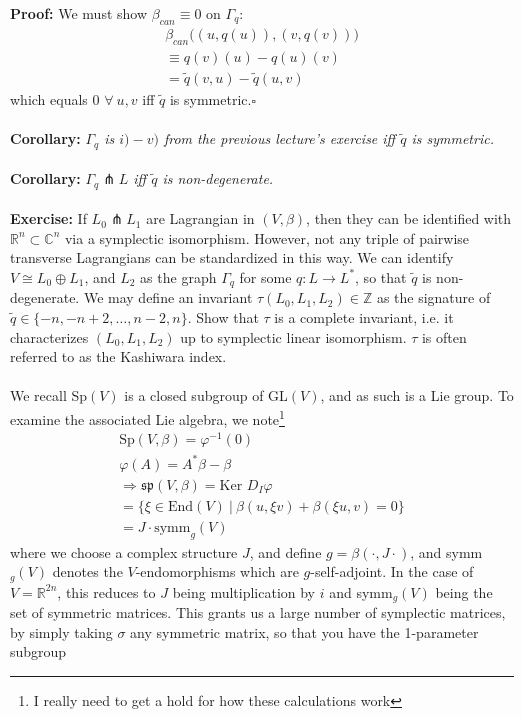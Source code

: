 \documentclass[12pt]{report}
\theoremstyle{definition}
\theoremstyle{remark}
\numberwithin{equation}{section}
\theoremstyle{definition}
\newcommand{\inv}[1]{#1^{-1}}
\newcommand{\bb}[1]{\mathbb{#1}}
\newcommand{\mqed}{\hfill\newline\null \hfill$\square$\\ }
\renewcommand{\tilde}{\widetilde}
\begin{document}
\textbf{Proof: }We must show $\beta_{can} \equiv 0$ on $\Gamma_q$:
\begin{gather*}
	\beta_{can}\Big((u,q(u)),(v,q(v))	\Big)\\
	\equiv q(v)(u)-q(u)(v)\\
	= \tilde q(v,u) - \tilde q(u,v)
\end{gather*} 
which equals 0 $\forall\ u,v$ iff $\tilde q$ is symmetric.\mqed\\
\textbf{Corollary: }\textit{$\Gamma_q$ is $i)-v)$ from the previous lecture's exercise iff $\tilde q$ is symmetric. }\\\\
\textbf{Corollary: }\textit{$\Gamma_q \pitchfork L$ iff $\tilde q$ is non-degenerate.}\\\\
\textbf{Exercise: }If $L_0 \pitchfork L_1$ are Lagrangian in $(V,\beta)$, then they can be identified with $\bb R^n \subset \bb C^n$ via a symplectic isomorphism. However, not any triple of pairwise transverse Lagrangians can be standardized in this way. We can identify $V \cong L_0 \oplus L_1$, and $L_2$ as the graph $\Gamma_q$ for some $q: L \to L^*$, so that $\tilde q$ is non-degenerate. We may define an invariant $\tau(L_0,L_1,L_2) \in \bb Z$ as the signature of $\tilde q \in \{-n, -n+2, \dots, n-2, n\}$. Show that $\tau$ is a complete invariant, i.e. it characterizes $(L_0, L_1, L_2)$ up to symplectic linear isomorphism. $\tau$ is often referred to as the Kashiwara index. \\\\
We recall Sp$(V)$ is a closed subgroup of GL$(V)$, and as such is a Lie group. To examine the associated Lie algebra, we note\footnote{I really need to get a hold for how these calculations work} 
\begin{gather*}
	\text{Sp}(V,\beta) = \inv \varphi(0)\\
	\varphi(A) = A^* \beta - \beta\\
	\Rightarrow \mathfrak{sp}(V,\beta) = \text{Ker } D_I \varphi \\
	= \{\xi \in \text{End}(V)\ |\ \beta(u,\xi v) + \beta(\xi u,v) = 0\}	\\
	= J \cdot \text{symm}_g(V)
\end{gather*}
where we choose a complex structure $J$, and define $g = \beta(\cdot, J\cdot)$, and symm$_g(V)$ denotes the $V$-endomorphisms which are $g$-self-adjoint. In the case of $V = \bb R^{2n}$, this reduces to $J$ being multiplication by $i$ and symm$_g(V)$ being the set of symmetric matrices. This grants us a large number of symplectic matrices, by simply taking $\sigma$ any symmetric matrix, so that you have the 1-parameter subgroup 
\end{document}
